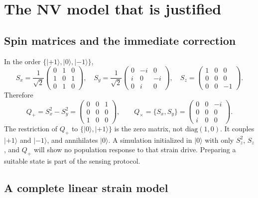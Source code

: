 \documentclass[a4paper,11pt]{article}
\newcommand{\ac}[2]{\{#1,#2\}}
\newcommand{\ket}[1]{\lvert #1\rangle}
\begin{document}
\section{The NV model that is justified}
\label{sec:nv}

\subsection{Spin matrices and the immediate correction}

In the order $\{\ket{+1},\ket0,\ket{-1}\}$,
\begin{equation}
 S_x=\frac1{\sqrt2}\begin{pmatrix}0&1&0\\1&0&1\\0&1&0\end{pmatrix},\quad
 S_y=\frac1{\sqrt2}\begin{pmatrix}0&-i&0\\i&0&-i\\0&i&0\end{pmatrix},\quad
 S_z=\begin{pmatrix}1&0&0\\0&0&0\\0&0&-1\end{pmatrix}.
\end{equation}
Therefore
\begin{equation}
 Q_+=S_x^2-S_y^2=\begin{pmatrix}0&0&1\\0&0&0\\1&0&0\end{pmatrix},\qquad
 Q_\times=\ac{S_x}{S_y}=\begin{pmatrix}0&0&-i\\0&0&0\\i&0&0\end{pmatrix}.
 \label{eq:Q}
\end{equation}
The restriction of $Q_+$ to $\{\ket0,\ket{+1}\}$ is the zero matrix, not $\mathrm{diag}(1,0)$. It couples $\ket{+1}$ and $\ket{-1}$, and annihilates $\ket0$. A simulation initialized in $\ket0$ with only $S_z^2$, $S_z$, and $Q_+$ will show no population response to that strain drive. Preparing a suitable state is part of the sensing protocol.

\subsection{A complete linear strain model}
\end{document}
